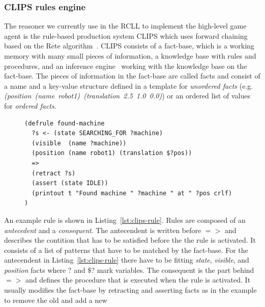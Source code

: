 \documentclass[a4paper,11pt]{article}
\newcommand{\reflst}[1]{Listing~\ref{#1}}
\begin{document}
\subsubsection{CLIPS rules engine} The reasoner we currently use in the RCLL
to implement the high-level game agent is the rule-based production
system CLIPS which uses forward chaining based on the Rete
algorithm~\cite{Rete}. CLIPS consists of a fact-base, which is a
working memory with many small pieces of information, a knowledge base
with rules and procedures, and an inference engine~\cite{CLIPS-RM}
working with the knowledge base on the fact-base. The pieces of
information in the fact-base are called facts and consist of a name
and a key-value structure defined in a template for \emph{unordered
  facts}
(e.g. \textit{(position~(name~robot1)~(translation~2.5~1.0~0.0)}) or
an ordered list of values for \emph{ordered facts}.
\begin{figure}
\begin{lstlisting}[showlines,style=ReallySmallCLIPS, caption={CLIPS
    rule to change a robots state when the object it searched for is visible.},
  label=lst:clips-rule,
  emph={skill, args, state, target, res},
  emphstyle=\bfseries\color{green!80!black},
  emph={[2]\?skill, \$\?args, wait-for-lock, \?target, use,
  WAIT-FOR-LOCK, SKILL-EXECUTION, running},
  emphstyle={[2]\bfseries\color{blue!80!black}},
  morekeywords={retract, assert, modify, skill-call, skill-to-execute,
  wait-for-lock}]
(defrule found-machine
  ?s <- (state SEARCHING_FOR ?machine)
  (visible  (name ?machine))
  (position (name robot1) (translation $?pos))
  =>  
  (retract ?s) 
  (assert (state IDLE))
  (printout t "Found machine " ?machine " at " ?pos crlf)
)
\end{lstlisting} %
\end{figure}
An example rule is shown in \reflst{lst:clips-rule}. Rules are
composed of an \emph{antecedent} and a \emph{consequent}. The
antecendent is written before $=>$ and describes the contition that
has to be satisfied before the the rule is activated. It consists of a
list of patterns that have to be matched by the fact-base. For the
antecendent in \reflst{lst:clips-rule} there have to be fitting
\textit{state}, \textit{visible}, and \textit{position} facts where
$?$ and $\$?$ mark variables. The consequent is the part behind $=>$
and defines the procedure that is executed when the rule is
activated. It usually modifies the fact-base by retracting and
asserting facts as in the example to remove the old and add a new
\end{document}
